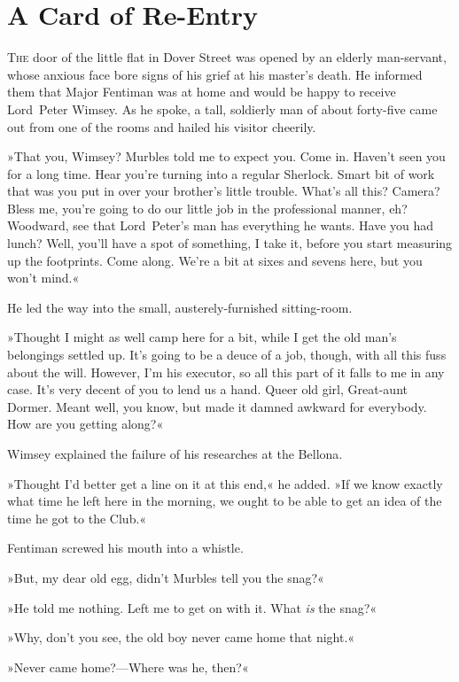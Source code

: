 \chapter{A Card of Re-Entry}
\lettrine[lines=4]{T}{he} door of the little flat in Dover Street was opened by an elderly man-servant, whose anxious face bore signs of his grief at his master's death. He informed them that Major Fentiman was at home and would be happy to receive Lord~Peter Wimsey. As he spoke, a tall, soldierly man of about forty-five came out from one of the rooms and hailed his visitor cheerily.

»That you, Wimsey? Murbles told me to expect you. Come in. Haven't seen you for a long time. Hear you're turning into a regular Sherlock. Smart bit of work that was you put in over your brother's little trouble. What's all this? Camera? Bless me, you're going to do our little job in the professional manner, eh? Woodward, see that Lord~Peter's man has everything he wants. Have you had lunch? Well, you'll have a spot of something, I take it, before you start measuring up the footprints. Come along. We're a bit at sixes and sevens here, but you won't mind.«

He led the way into the small, austerely-furnished sitting-room.

»Thought I might as well camp here for a bit, while I get the old man's belongings settled up. It's going to be a deuce of a job, though, with all this fuss about the will. However, I'm his executor, so all this part of it falls to me in any case. It's very decent of you to lend us a hand. Queer old girl, Great-aunt Dormer. Meant well, you know, but made it damned awkward for everybody. How are you getting along?«

Wimsey explained the failure of his researches at the Bellona.

»Thought I'd better get a line on it at this end,« he added. »If we know exactly what time he left here in the morning, we ought to be able to get an idea of the time he got to the Club.«

Fentiman screwed his mouth into a whistle.

»But, my dear old egg, didn't Murbles tell you the snag?«

»He told me nothing. Left me to get on with it. What \textit{is} the snag?«

»Why, don't you see, the old boy never came home that night.«

»Never came home?—Where was he, then?«

